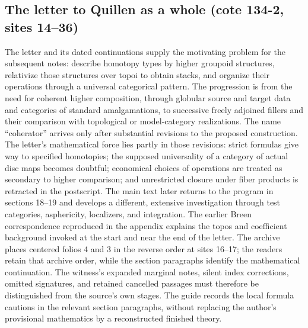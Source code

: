 \documentclass[10pt,oneside]{book}
\begin{document}
\subsection*{The letter to Quillen as a whole (cote 134-2, sites 14--36)}
The letter and its dated continuations supply the motivating problem for the subsequent notes: describe homotopy types by higher groupoid structures, relativize those structures over topoi to obtain stacks, and organize their operations through a universal categorical pattern. The progression is from the need for coherent higher composition, through globular source and target data and categories of standard amalgamations, to successive freely adjoined fillers and their comparison with topological or model-category realizations. The name ``coherator'' arrives only after substantial revisions to the proposed construction. The letter's mathematical force lies partly in those revisions: strict formulas give way to specified homotopies; the supposed universality of a category of actual disc maps becomes doubtful; economical choices of operations are treated as secondary to higher comparison; and unrestricted closure under fiber products is retracted in the postscript. The main text later returns to the program in sections 18--19 and develops a different, extensive investigation through test categories, asphericity, localizers, and integration. The earlier Breen correspondence reproduced in the appendix explains the topos and coefficient background invoked at the start and near the end of the letter. The archive places centered folios 4 and 3 in the reverse order at sites 16--17; the readers retain that archive order, while the section paragraphs identify the mathematical continuation. The witness's expanded marginal notes, silent index corrections, omitted signatures, and retained cancelled passages must therefore be distinguished from the source's own stages. The guide records the local formula cautions in the relevant section paragraphs, without replacing the author's provisional mathematics by a reconstructed finished theory.
\end{document}

